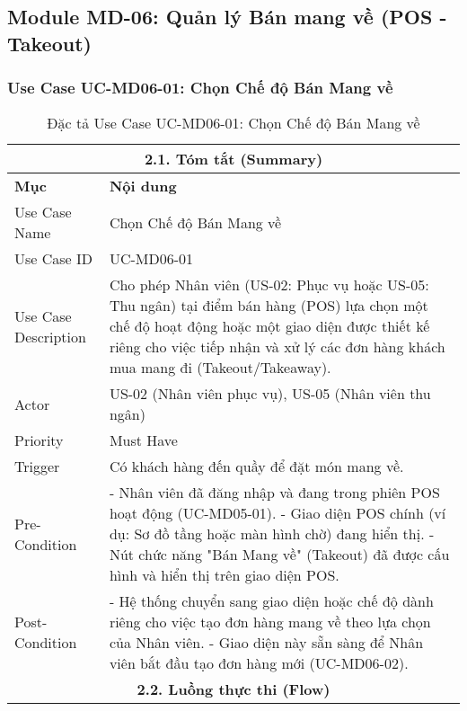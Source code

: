 \subsection{Module MD-06: Quản lý Bán mang về (POS - Takeout)}

\subsubsection{Use Case UC-MD06-01: Chọn Chế độ Bán Mang về}
\begin{longtable}{|m{4cm}|p{11cm}|}
\caption{Đặc tả Use Case UC-MD06-01: Chọn Chế độ Bán Mang về} \label{tab:uc_md06_01_final_v3} \\
\hline
\multicolumn{2}{|c|}{\textbf{2.1. Tóm tắt (Summary)}} \\
\hline
\textbf{Mục} & \textbf{Nội dung} \\
\hline
\endhead %
\hline
\endfoot %
\hline
\endlastfoot %
Use Case Name & Chọn Chế độ Bán Mang về \\
\hline
Use Case ID & UC-MD06-01 \\
\hline
Use Case Description & Cho phép Nhân viên (US-02: Phục vụ hoặc US-05: Thu ngân) tại điểm bán hàng (POS) lựa chọn một chế độ hoạt động hoặc một giao diện được thiết kế riêng cho việc tiếp nhận và xử lý các đơn hàng khách mua mang đi (Takeout/Takeaway). \\
\hline
Actor & US-02 (Nhân viên phục vụ), US-05 (Nhân viên thu ngân) \\
\hline
Priority & Must Have \\
\hline
Trigger & Có khách hàng đến quầy để đặt món mang về. \\
\hline
Pre-Condition & - Nhân viên đã đăng nhập và đang trong phiên POS hoạt động (UC-MD05-01). \newline - Giao diện POS chính (ví dụ: Sơ đồ tầng hoặc màn hình chờ) đang hiển thị. \newline - Nút chức năng "Bán Mang về" (Takeout) đã được cấu hình và hiển thị trên giao diện POS. \\
\hline
Post-Condition & - Hệ thống chuyển sang giao diện hoặc chế độ dành riêng cho việc tạo đơn hàng mang về theo lựa chọn của Nhân viên. \newline - Giao diện này sẵn sàng để Nhân viên bắt đầu tạo đơn hàng mới (UC-MD06-02). \\
\hline
\multicolumn{2}{|c|}{\textbf{2.2. Luồng thực thi (Flow)}} \\

\end{longtable}
